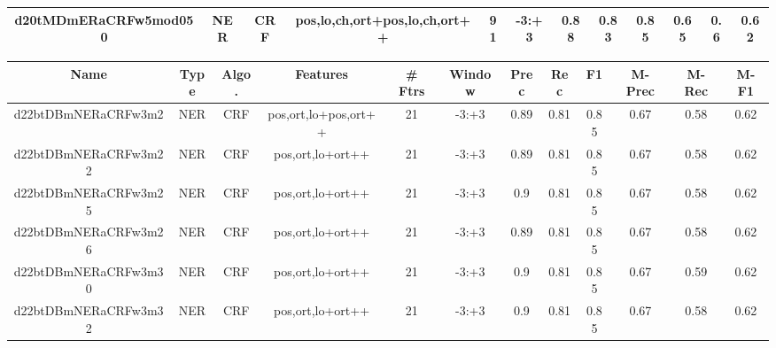 \documentclass[a4paper]{article}
\begin{document}
\begin{landscape}
\begin{center}
\begin{tabular}{ |c|c|c|c|c|c|c|c|c|c|c|c|}
 	
 
 	
 		
 		\small{ d20tMDmERaCRFw5mod050 } & NER & CRF & pos,lo,ch,ort+pos,lo,ch,ort++  &  91 &  -3:+3  &  0.88 & 0.83 & 0.85  &  0.65 & 0.6 & 0.62 \\
 		
 \hline
\end{tabular}
\end{center}




\begin{center}
\begin{tabular}{ |c|c|c|c|c|c|c|c|c|c|c|c|} 
 \hline
 	Name & Type & Algo. & Features & \# Ftrs & Window & Prec & Rec & F1 & M-Prec & M-Rec & M-F1\\
 \hline

 		

 	
 
 	
 		
 		\small{ d22btDBmNERaCRFw3m2 } & NER & CRF & pos,ort,lo+pos,ort++  &  21 &  -3:+3  &  0.89 & 0.81 & 0.85  &  0.67 & 0.58 & 0.62 \\
 		

 	
 
 	
 		
 		\small{ d22btDBmNERaCRFw3m22 } & NER & CRF & pos,ort,lo+ort++  &  21 &  -3:+3  &  0.89 & 0.81 & 0.85  &  0.67 & 0.58 & 0.62 \\
 		

 	
 
 	
 		
 		\small{ d22btDBmNERaCRFw3m25 } & NER & CRF & pos,ort,lo+ort++  &  21 &  -3:+3  &  0.9 & 0.81 & 0.85  &  0.67 & 0.58 & 0.62 \\
 		

 	
 
 	
 		
 		\small{ d22btDBmNERaCRFw3m26 } & NER & CRF & pos,ort,lo+ort++  &  21 &  -3:+3  &  0.89 & 0.81 & 0.85  &  0.67 & 0.58 & 0.62 \\
 		

 	
 
 	
 		
 		\small{ d22btDBmNERaCRFw3m30 } & NER & CRF & pos,ort,lo+ort++  &  21 &  -3:+3  &  0.9 & 0.81 & 0.85  &  0.67 & 0.59 & 0.62 \\
 		

 	
 
 	
 		
 		\small{ d22btDBmNERaCRFw3m32 } & NER & CRF & pos,ort,lo+ort++  &  21 &  -3:+3  &  0.9 & 0.81 & 0.85  &  0.67 & 0.58 & 0.62 \\
 		


\end{tabular}
\end{center}
\end{landscape}
\end{document}
